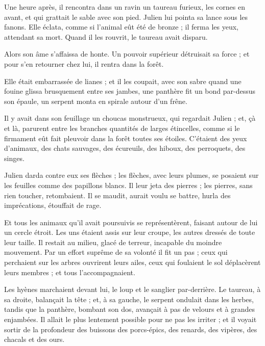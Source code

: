 \documentclass[]{book}
\begin{document}
                Une heure après, il rencontra dans un ravin un taureau furieux, les cornes en avant, et qui grattait le sable avec son pied. Julien lui pointa sa lance sous les fanons. Elle éclata, comme si l'animal eût été de bronze ; il ferma les yeux, attendant sa mort. Quand il les rouvrit, le taureau avait disparu.
                    
                Alors son âme s'affaissa de honte. Un pouvoir supérieur détruisait sa force ; et pour s'en retourner chez lui, il rentra dans la forêt.
                    
                Elle était embarrassée de lianes ; et il les coupait, avec son sabre quand une fouine glissa brusquement entre ses jambes, une panthère fit un bond par-dessus son épaule, un serpent monta en spirale autour d'un frêne.
                    
                Il y avait dans son feuillage un choucas monstrueux, qui regardait Julien ; et, çà et là, parurent entre les branches quantités de larges étincelles, comme si le firmament eût fait pleuvoir dans la forêt toutes ses étoiles. C'étaient des yeux d'animaux, des chats sauvages, des écureuils, des hiboux, des perroquets, des singes.
                    
                Julien darda contre eux ses flèches ; les flèches, avec leurs plumes, se posaient sur les feuilles comme des papillons blancs. Il leur jeta des pierres ; les pierres, sans rien toucher, retombaient. Il se maudit, aurait voulu se battre, hurla des imprécations, étouffait de rage.
                    
                Et tous les animaux qu'il avait poursuivis se représentèrent, faisant autour de lui un cercle étroit. Les uns étaient assis sur leur croupe, les autres dressés de toute leur taille. Il restait au milieu, glacé de terreur, incapable du moindre mouvement. Par un effort suprême de sa volonté il fit un pas ; ceux qui perchaient sur les arbres ouvrirent leurs ailes, ceux qui foulaient le sol déplacèrent leurs membres ; et tous l'accompagnaient.
                    
                Les hyènes marchaient devant lui, le loup et le sanglier par-derrière. Le taureau, à sa droite, balançait la tête ; et, à sa gauche, le serpent ondulait dans les herbes, tandis que la panthère, bombant son dos, avançait à pas de velours et à grandes enjambées. Il allait le plus lentement possible pour ne pas les irriter ; et il voyait sortir de la profondeur des buissons des porcs-épics, des renards, des vipères, des chacals et des ours.
                    
\end{document}
